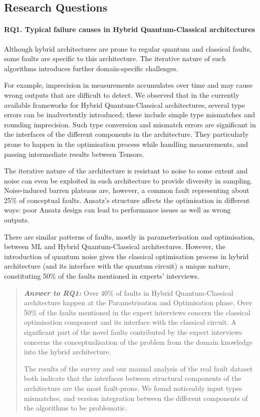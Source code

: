 \subsection{Research Questions}
\paragraph{RQ1. Typical failure causes in Hybrid Quantum-Classical architectures}



Although hybrid architectures are prone to regular quantum and classical faults, some faults are specific to this architecture. The iterative nature of such algorithms introduces further domain-specific challenges.


For example, imprecision in measurements accumulates over time and may cause wrong outputs that are difficult to detect. We observed that in the currently available frameworks for Hybrid Quantum-Classical architectures,  several type errors can be inadvertently introduced; these include simple type mismatches and rounding imprecision. Such type conversion and mismatch errors are significant in the interfaces of the different components in the architecture. They particularly prone to happen in the optimisation process while handling measurements, and passing intermediate results between Tensors.

The iterative nature of the architecture is resistant to noise to some extent and noise can even be exploited in such architecture to provide diversity in sampling. Noise-induced barren plateaus are, however, a common fault representing about 25\% of conceptual faults. Ansatz's structure affects the optimisation in different ways: poor Ansatz design can lead to performance issues as well as wrong outputs.

There are similar patterns of faults, mostly in parameterisation and optimisation, 
between ML and Hybrid Quantum-Classical architectures. However,  the introduction of quantum noise gives the classical optimisation process in hybrid architecture (and its interface with the quantum circuit)  a unique nature, constituting 50\% of the faults mentioned in experts' interviews.

\begin{quote}
\textbf{\emph{Answer to RQ1:}} 
Over 40\% of faults in Hybrid Quantum-Classical architecture happen at the Parametrisation and Optimisation phase.  
Over 50\% of the faults mentioned in the expert interviews concern the classical optimisation component and its interface with the classical circuit. 
A significant part of the novel faults contributed by the expert interviews concerns the conceptualisation of the problem from the domain knowledge into the hybrid architecture. 

The results of the survey and our manual analysis of the real fault dataset both indicate that the interfaces between structural components of the architecture are the most fault-prone. We found noticeably input types mismatches, and version integration between the different components of the algorithms to be problematic.
\end{quote}



